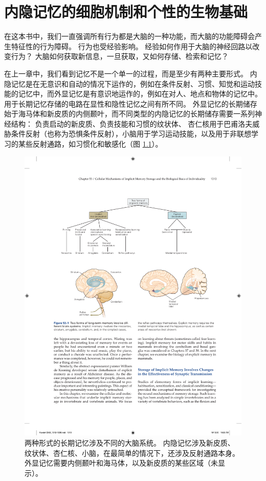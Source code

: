 \chapter{内隐记忆的细胞机制和个性的生物基础} \label{chap:chap53}

在这本书中，我们一直强调所有行为都是大脑的一种功能，而大脑的功能障碍会产生特征性的行为障碍。
行为也受经验影响。
经验如何作用于大脑的神经回路以改变行为？
大脑如何获取新信息，一旦获取，又如何存储、检索和记忆？


在上一章中，我们看到记忆不是一个单一的过程，而是至少有两种主要形式。
内隐记忆是在无意识和自动的情况下运作的，例如在条件反射、习惯、知觉和运动技能的记忆中，而外显记忆是有意识地运作的，例如在对人、地点和物体的记忆中。
用于长期记忆存储的电路在显性和隐性记忆之间有所不同。
外显记忆的长期储存始于海马体和新皮质的内侧颞叶，而不同类型的内隐记忆的长期储存需要一系列神经结构：
负责启动的新皮质、负责技能和习惯的纹状体、 杏仁核用于巴甫洛夫威胁条件反射（也称为恐惧条件反射），小脑用于学习运动技能，以及用于非联想学习的某些反射通路，如习惯化和敏感化（图 \ref{fig:53_1}）。


\begin{figure}[htbp]
	\centering
	\includegraphics[width=0.7\linewidth]{chap53/fig_53_1}
	\caption{两种形式的长期记忆涉及不同的大脑系统。 内隐记忆涉及新皮质、纹状体、杏仁核、小脑，在最简单的情况下，还涉及反射通路本身。 外显记忆需要内侧颞叶和海马体，以及新皮质的某些区域（未显示）。}
	\label{fig:53_1}
\end{figure}


